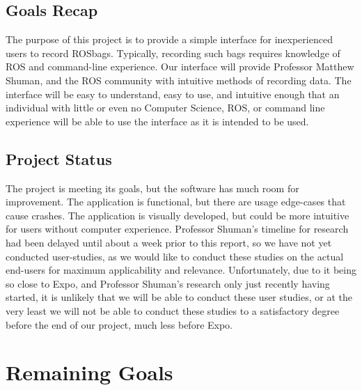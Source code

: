 \documentclass[onecolumn, draftclsnofoot,10pt, compsoc]{IEEEtran}
\begin{document}
\subsection{Goals Recap}
The purpose of this project is to provide a simple interface for inexperienced users to record ROSbags. Typically, recording such bags requires knowledge of ROS and command-line experience. Our interface will provide Professor Matthew Shuman, and the ROS community with intuitive methods of recording data. The interface will be easy to understand, easy to use, and intuitive enough that an individual with little or even no Computer Science, ROS, or command line experience will be able to use the interface as it is intended to be used.

\subsection{Project Status}
The project is meeting its goals, but the software has much room for improvement. The application is functional, but there are usage edge-cases that cause crashes. The application is visually developed, but could be more intuitive for users without computer experience. Professor Shuman’s timeline for research had been delayed until about a week prior to this report, so we have not yet conducted user-studies, as we would like to conduct these studies on the actual end-users for maximum applicability and relevance. Unfortunately, due to it being so close to Expo, and Professor Shuman's research only just recently having started, it is unlikely that we will be able to conduct these user studies, or at the very least we will not be able to conduct these studies to a satisfactory degree before the end of our project, much less before Expo.

\section{Remaining Goals}
\end{document}

